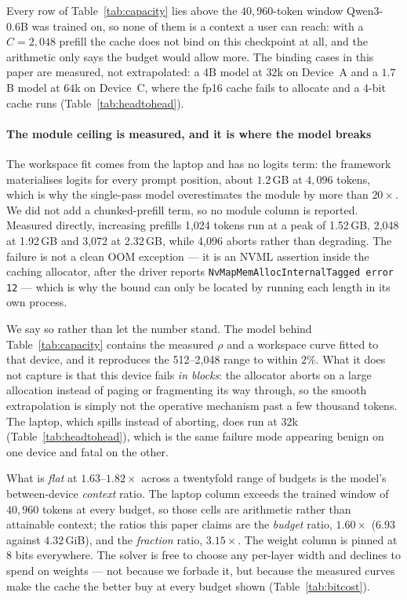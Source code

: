 \documentclass[10pt,journal]{IEEEtran}
\newcommand{\rhoSym}{\rho}
\begin{document}
Every row of Table~\ref{tab:capacity} lies above the $40{,}960$-token
window Qwen3-0.6B was trained on, so none of them is a context a user can
reach: with a $C=2{,}048$ prefill the cache does not bind on this checkpoint
at all, and the arithmetic only says the budget would allow more. The binding
cases in this paper are measured, not extrapolated: a 4B model at $32$k on
Device~A and a $1.7$B model at $64$k on Device~C, where the fp16 cache fails
to allocate and a 4-bit cache runs (Table~\ref{tab:headtohead}).

\paragraph*{The module ceiling is measured, and it is where the model breaks}
The workspace fit comes from the laptop and has no logits term: the framework
materialises logits for every prompt position, about $1.2$\,GB at $4{,}096$
tokens, which is why the single-pass model overestimates the module by more
than $20\times$. We did not add a chunked-prefill term, so no module column is
reported. Measured directly, increasing prefills  1{,}024 tokens run at a peak of 1.52\,GB, 2{,}048 at 1.92\,GB and 3{,}072 at 2.32\,GB, while 4{,}096 aborts rather than degrading. The failure is not a
clean OOM exception --- it is an NVML assertion inside the caching allocator,
after the driver reports \texttt{NvMapMemAllocInternalTagged error 12} --- which is
why the bound can only be located by running each length in its own process.

We say so rather than let the number stand. The model behind Table~\ref{tab:capacity} contains the
measured $\rhoSym$ and a workspace curve fitted to that device, and it reproduces
the 512--2{,}048 range to within $2\%$. What it does not capture is that this
device fails \emph{in blocks}: the allocator aborts on a large allocation instead
of paging or fragmenting its way through, so the smooth extrapolation is simply
not the operative mechanism past a few thousand tokens. The laptop, which spills
instead of aborting, does run at 32k (Table~\ref{tab:headtohead}), which is the
same failure mode appearing benign on one device and fatal on the other.

What is \emph{flat} at $1.63$--$1.82\times$ across a twentyfold range of budgets
is the model's between-device \emph{context} ratio. The laptop
column exceeds the trained window of $40{,}960$ tokens at every budget, so those
cells are arithmetic rather than attainable context; the ratios this paper
claims are the \emph{budget} ratio, $1.60\times$ ($6.93$ against $4.32$\,GiB), and
the \emph{fraction} ratio, $3.15\times$. The weight column is pinned at 8 bits
everywhere. The solver is free to
choose any per-layer width and declines to spend on weights --- not because we
forbade it, but because the measured curves make the cache the better buy at
every budget shown (Table~\ref{tab:bitcost}).
\end{document}
